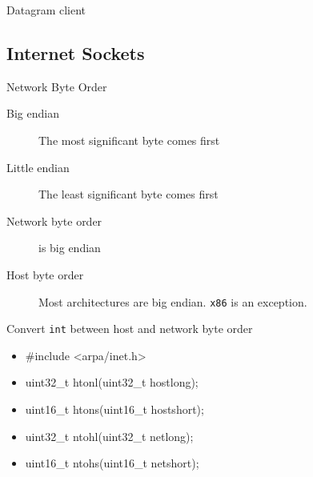 \begin{frame}
  \begin{description}
  \item[Datagram client] 
  \end{description}

\end{frame}

\subsection{Internet Sockets}
\label{sec:internet-sockets}

\begin{frame}{Network Byte Order}
  \begin{description}
  \item[Big endian] The most significant byte comes first
  \item[Little endian] The least significant byte comes first
  \end{description}
  \begin{center}
  \end{center}
  \begin{description}
  \item[Network byte order] is big endian
  \item[Host byte order] Most architectures are big endian. \texttt{x86} is an exception.
  \end{description}
\end{frame}

\begin{frame}
  \begin{iblock}{Convert \texttt{int} between host and network byte order}
    \ttfamily
    \begin{itemize}
      \item[] \#include <arpa/inet.h>
      \item[] uint32\_t htonl(uint32\_t hostlong);
      \item[] uint16\_t htons(uint16\_t hostshort);
      \item[] uint32\_t ntohl(uint32\_t netlong);
      \item[] uint16\_t ntohs(uint16\_t netshort);
    \end{itemize}
  \end{iblock}
\end{frame}

